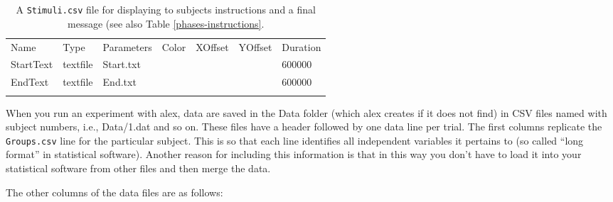 \documentclass[11pt,]{article}
\renewcommand{\medskip}{}
\begin{document}
\begin{table*}[t]\begin{center}\small\begin{tabular}{@{}lllllll@{}}
\hline\noalign{\medskip}
Name & Type & Parameters & Color & XOffset & YOffset & Duration
\\\noalign{\medskip}
\hline\noalign{\medskip}
StartText & textfile & Start.txt & & & & 600000
\\\noalign{\medskip}
EndText & textfile & End.txt & & & & 600000
\\\noalign{\medskip}
\hline
\noalign{\medskip}
\end{tabular}\caption{A \texttt{Stimuli.csv} file for displaying to subjects
instructions and a final message (see also Table
\ref{phases-instructions}.}
\end{center}\end{table*}


When you run an experiment with alex, data are saved in the Data folder
(which alex creates if it does not find) in CSV files named with subject
numbers, i.e., Data/1.dat and so on. These files have a header followed
by one data line per trial. The first columns replicate the
\texttt{Groups.csv} line for the particular subject. This is so that
each line identifies all independent variables it pertains to (so called
``long format'' in statistical software). Another reason for including
this information is that in this way you don't have to load it into your
statistical software from other files and then merge the data.

The other columns of the data files are as follows:
\end{document}
